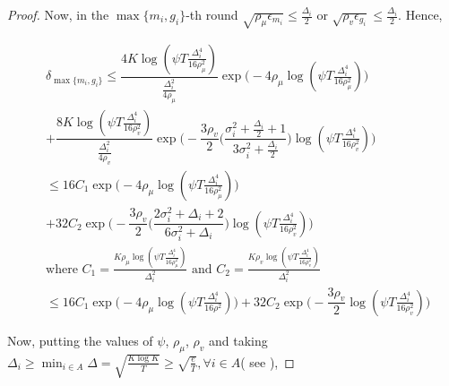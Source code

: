 \begin{proof}
Now, in the $\max\lbrace m_{i}, g_{i}\rbrace$-th round $\sqrt{\rho_{\mu}\epsilon_{m_{i}}}\leq \frac{\Delta_{i}}{2}$ or $\sqrt{\rho_v\epsilon_{g_{i}}}\leq \frac{\Delta_{i}}{2}$. Hence,

\begin{small}
\begin{align*}
&\delta_{\max\lbrace m_{i},g_{i}\rbrace} \leq \dfrac{4K\log (\psi T \frac{\Delta_{i}^{4}}{16\rho_{\mu}^{2}})}{\frac{\Delta_{i}^{2}}{4\rho_{\mu}}}\exp\bigg(-4\rho_{\mu}\log (\psi T\frac{\Delta_{i}^{4}}{16\rho_{\mu}^{2}})\bigg)\\
& + \dfrac{8K\log (\psi T \frac{\Delta_{i}^{4}}{16\rho_{v}^{2}})}{\frac{\Delta_{i}^{2}}{4\rho_{v}}}\exp\bigg(- \dfrac{3\rho_v}{2} \bigg(\dfrac{\sigma_{i}^{2}+\frac{\Delta_{i}}{2}+1}{3\sigma_{i}^{2}+\frac{\Delta_{i}}{2}}\bigg) \log(\psi T\frac{\Delta_{i}^{4}}{16\rho_{v}^{2}}) \bigg)\\
&\leq 16 C_1\exp\bigg(-4\rho_{\mu}\log (\psi T\frac{\Delta_{i}^{4}}{16\rho_{\mu}^{2}})\bigg)\\
& + 32C_2\exp\bigg(- \dfrac{3\rho_v}{2} \bigg(\dfrac{2\sigma_{i}^{2}+\Delta_{i}+2}{6\sigma_{i}^{2}+\Delta_{i}}\bigg) \log(\psi T\frac{\Delta_{i}^{4}}{16\rho_{v}^{2}}) \bigg)\\
&\text{where $C_1=\frac{K\rho_{\mu}\log (\psi T \frac{\Delta_{i}^{4}}{16\rho_{\mu}^{2}})}{\Delta_{i}^{2}}$ and $C_2= \frac{K\rho_v\log (\psi T \frac{\Delta_{i}^{4}}{16\rho_{v}^{2}})}{\Delta_{i}^{2}}$}\\
&\leq 16 C_1\exp\bigg(-4\rho_{\mu}\log (\psi T\frac{\Delta_{i}^{4}}{16\rho^{2}})\bigg)
 + 32C_2\exp\bigg(- \dfrac{3\rho_v}{2} \log(\psi T\frac{\Delta_{i}^{4}}{16\rho_{v}^{2}}) \bigg)
\end{align*}
\end{small}

Now, putting the values of $\psi$, $\rho_{\mu}$, $\rho_v$ and taking $\Delta_{i}\geq\min_{i\in A}\Delta=\sqrt{\frac{K\log K}{T}}\geq \sqrt{\frac{e}{T}},\forall i\in A$( see \cite{auer2010ucb}), 


\end{proof}
